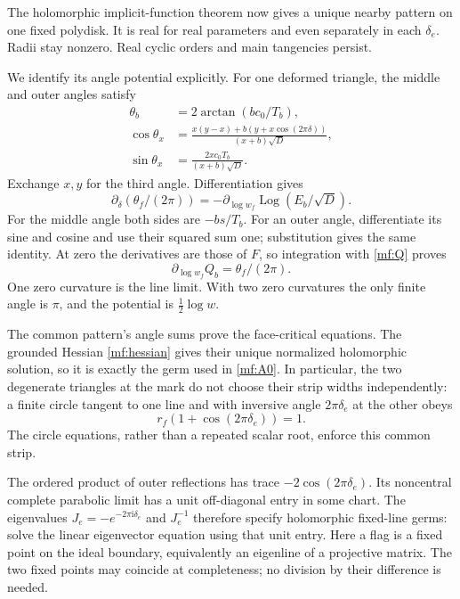 \documentclass[11pt]{article}
\numberwithin{equation}{section}
\theoremstyle{definition}
\theoremstyle{remark}
\newcommand{\ii}{\mathrm i}
\newcommand{\Log}{\operatorname{Log}}
\begin{document}
The holomorphic implicit-function theorem now gives a unique nearby
pattern on one fixed polydisk. It is real for real parameters and even
separately in each \(\delta_e\). Radii stay nonzero. Real cyclic
orders and main tangencies persist.

We identify its angle potential explicitly. For one deformed triangle,
the middle and outer angles satisfy
\begin{equation}\label{mf:deformed-angles}
\begin{aligned}
 \theta_b&=2\arctan(bc_0/T_b),\\
 \cos\theta_x&=
  \frac{x(y-x)+b(y+x\cos(2\pi\delta))}{(x+b)\sqrt D},\\
 \sin\theta_x&=\frac{2xc_0T_b}{(x+b)\sqrt D}.
\end{aligned}
\end{equation}
Exchange \(x,y\) for the third angle. Differentiation gives
\[
 \partial_\delta(\theta_f/(2\pi))
              =-\partial_{\log w_f}\Log(E_b/\sqrt D).
\]
For the middle angle both sides are \(-bs/T_b\). For an outer
angle, differentiate its sine and cosine and use their squared sum
one; substitution gives the same identity. At zero the derivatives
are those of \(F\), so integration with \eqref{mf:Q} proves
\begin{equation}\label{mf:angle-gradient}
                   \partial_{\log w_f}Q_b=\theta_f/(2\pi).
\end{equation}
One zero curvature is the line limit. With two zero curvatures the
only finite angle is \(\pi\), and the potential is \(\frac12\log w\).

The common pattern's angle sums prove the face-critical equations.
The grounded Hessian \eqref{mf:hessian} gives their unique normalized
holomorphic solution, so it is exactly the germ used in \eqref{mf:A0}.
In particular, the two degenerate triangles at the mark do not choose
their strip widths independently: a finite circle tangent to one line
and with inversive angle \(2\pi\delta_e\) at the other obeys
\begin{equation}\label{mf:strip}
                    r_f(1+\cos(2\pi\delta_e))=1.
\end{equation}
The circle equations, rather than a repeated scalar root, enforce this
common strip.

The ordered product of outer reflections has trace
\(-2\cos(2\pi\delta_e)\). Its noncentral complete parabolic limit
has a unit off-diagonal entry in some chart. The eigenvalues
\(J_e=-e^{-2\pi\ii\delta_e}\) and \(J_e^{-1}\) therefore specify
holomorphic fixed-line germs: solve the linear eigenvector equation
using that unit entry. Here a flag is a fixed point on the ideal boundary, equivalently
an eigenline of a projective matrix. The two fixed points may
coincide at completeness;
no division by their difference is needed.
\end{document}
